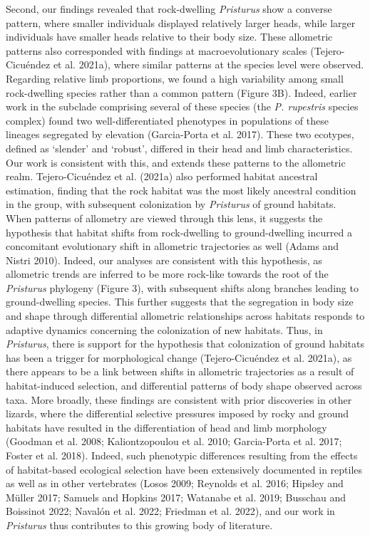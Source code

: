 \documentclass[
  11pt,
]{article}
\begin{document}
Second, our findings revealed that rock-dwelling \emph{Pristurus} show a
converse pattern, where smaller individuals displayed relatively larger
heads, while larger individuals have smaller heads relative to their
body size. These allometric patterns also corresponded with findings at
macroevolutionary scales (Tejero-Cicuéndez et al. 2021a), where similar
patterns at the species level were observed. Regarding relative limb
proportions, we found a high variability among small rock-dwelling
species rather than a common pattern (Figure 3B). Indeed, earlier work
in the subclade comprising several of these species (the \emph{P.
rupestris} species complex) found two well-differentiated phenotypes in
populations of these lineages segregated by elevation (Garcia-Porta et
al. 2017). These two ecotypes, defined as `slender' and `robust',
differed in their head and limb characteristics. Our work is consistent
with this, and extends these patterns to the allometric realm.
Tejero-Cicuéndez et al. (2021a) also performed habitat ancestral
estimation, finding that the rock habitat was the most likely ancestral
condition in the group, with subsequent colonization by \emph{Pristurus}
of ground habitats. When patterns of allometry are viewed through this
lens, it suggests the hypothesis that habitat shifts from rock-dwelling
to ground-dwelling incurred a concomitant evolutionary shift in
allometric trajectories as well (Adams and Nistri 2010). Indeed, our
analyses are consistent with this hypothesis, as allometric trends are
inferred to be more rock-like towards the root of the \emph{Pristurus}
phylogeny (Figure 3), with subsequent shifts along branches leading to
ground-dwelling species. This further suggests that the segregation in
body size and shape through differential allometric relationships across
habitats responds to adaptive dynamics concerning the colonization of
new habitats. Thus, in \emph{Pristurus}, there is support for the
hypothesis that colonization of ground habitats has been a trigger for
morphological change (Tejero-Cicuéndez et al. 2021a), as there appears
to be a link between shifts in allometric trajectories as a result of
habitat-induced selection, and differential patterns of body shape
observed across taxa. More broadly, these findings are consistent with
prior discoveries in other lizards, where the differential selective
pressures imposed by rocky and ground habitats have resulted in the
differentiation of head and limb morphology (Goodman et al. 2008;
Kaliontzopoulou et al. 2010; Garcia-Porta et al. 2017; Foster et al.
2018). Indeed, such phenotypic differences resulting from the effects of
habitat-based ecological selection have been extensively documented in
reptiles as well as in other vertebrates (Losos 2009; Reynolds et al.
2016; Hipsley and Müller 2017; Samuels and Hopkins 2017; Watanabe et al.
2019; Busschau and Boissinot 2022; Navalón et al. 2022; Friedman et al.
2022), and our work in \emph{Pristurus} thus contributes to this growing
body of literature. \hfill\break
\end{document}
